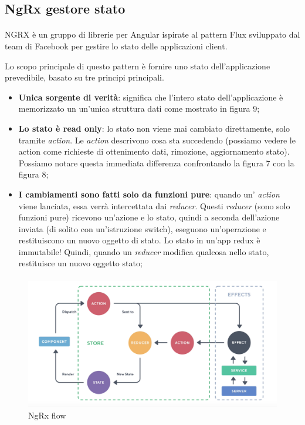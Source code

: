 \subsection{NgRx gestore stato}
\paragraph{}
NGRX è un gruppo di librerie per Angular ispirate al pattern Flux sviluppato dal team di Facebook per gestire
lo stato delle applicazioni client.

Lo scopo principale di questo pattern è fornire uno stato dell'applicazione prevedibile, basato su tre principi principali.

\begin{itemize}
    \item \textbf{Unica sorgente di verità}: significa che l'intero stato dell'applicazione è memorizzato un un'unica struttura dati come mostrato in figura 9;
    \item \textbf{Lo stato è read only}: lo stato non viene mai cambiato direttamente, 
    solo tramite \textit{action}. Le \textit{action} descrivono cosa sta succedendo (possiamo vedere le action
    come richieste di ottenimento dati, rimozione, aggiornamento stato). Possiamo notare questa immediata differenza confrontando la figura 7 con la figura 8;
    \item \textbf{I cambiamenti sono fatti solo da funzioni pure}: quando un' \textit{action} viene lanciata, essa verrà
    intercettata dai \textit{reducer}.
    Questi \textit{reducer} (sono solo funzioni pure) ricevono un'azione e lo stato, quindi a seconda dell'azione inviata 
    (di solito con un'istruzione switch), eseguono un'operazione e restituiscono un nuovo oggetto di stato. 
    Lo stato in un'app redux è immutabile! Quindi, quando un \textit{reducer} modifica qualcosa nello stato, 
    restituisce un nuovo oggetto stato;
\end{itemize}

\paragraph{}

\begin{figure}[h!]
    \centering  
    \caption{NgRx flow}
    \includegraphics[scale=0.4]{img/cap2/ngrx}
\end{figure}
